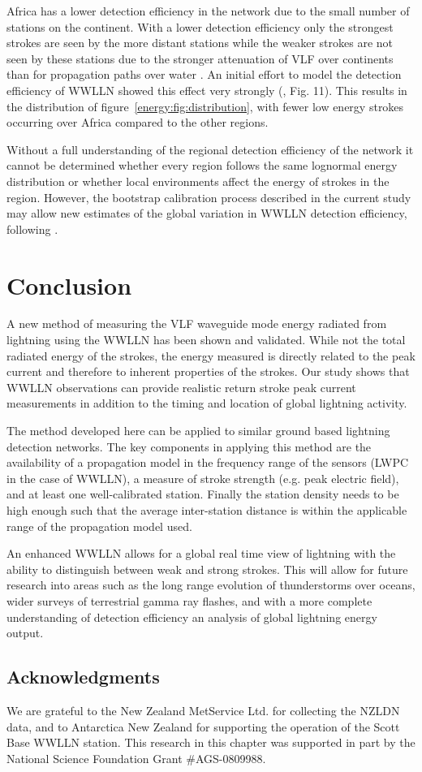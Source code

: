 Africa has a lower detection efficiency in the network due to the small number of stations on the continent.
With a lower detection efficiency only the strongest strokes are seen by the more distant stations while the weaker strokes are not seen by these stations due to the stronger attenuation of VLF over continents than for propagation paths over water \citep{Wait1970}.
An initial effort to model the detection efficiency of WWLLN showed this effect very strongly (\citet{Rodger2006}, Fig. 11).
This results in the distribution of figure~\ref{energy:fig:distribution}, with fewer low energy strokes occurring over Africa compared to the other regions.

Without a full understanding of the regional detection efficiency of the network it cannot be determined whether every region follows the same lognormal energy distribution or whether local environments affect the energy of strokes in the region.
However, the bootstrap calibration process described in the current study may allow new estimates of the global variation in WWLLN detection efficiency, following \citet{Rodger2006}.

\section{Conclusion}

A new method of measuring the VLF waveguide mode energy radiated from lightning using the WWLLN has been shown and validated.
While not the total radiated energy of the strokes, the energy measured is directly related to the peak current and therefore to inherent properties of the strokes.
Our study shows that WWLLN observations can provide realistic return stroke peak current measurements in addition to the timing and location of global lightning activity.

The method developed here can be applied to similar ground based lightning detection networks.
The key components in applying this method are the availability of a propagation model in the frequency range of the sensors (LWPC in the case of WWLLN), a measure of stroke strength (e.g. peak electric field), and at least one well-calibrated station.
Finally the station density needs to be high enough such that the average inter-station distance is within the applicable range of the propagation model used.

An enhanced WWLLN allows for a global real time view of lightning with the ability to distinguish between weak and strong strokes.
This will allow for future research into areas such as the long range evolution of thunderstorms over oceans, wider surveys of terrestrial gamma ray flashes, and with a more complete understanding of detection efficiency an analysis of global lightning energy output.

\subsection*{Acknowledgments} 
We are grateful to the New Zealand MetService Ltd. for collecting the NZLDN data, and to Antarctica New Zealand for supporting the operation of the Scott Base WWLLN station.
This research in this chapter was supported in part by the National Science Foundation Grant \#AGS-0809988.
